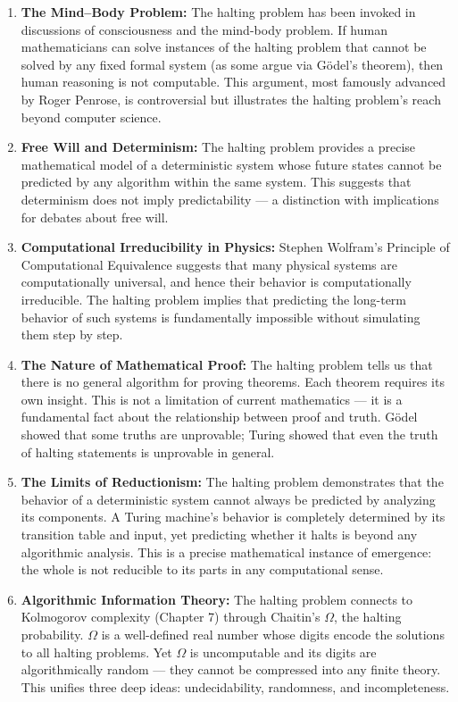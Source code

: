 \begin{enumerate}
\item \textbf{The Mind--Body Problem:} The halting problem has been invoked in discussions of consciousness and the mind-body problem. If human mathematicians can solve instances of the halting problem that cannot be solved by any fixed formal system (as some argue via G\"odel's theorem), then human reasoning is not computable. This argument, most famously advanced by Roger Penrose, is controversial but illustrates the halting problem's reach beyond computer science.

\item \textbf{Free Will and Determinism:} The halting problem provides a precise mathematical model of a deterministic system whose future states cannot be predicted by any algorithm within the same system. This suggests that determinism does not imply predictability — a distinction with implications for debates about free will.

\item \textbf{Computational Irreducibility in Physics:} Stephen Wolfram's Principle of Computational Equivalence suggests that many physical systems are computationally universal, and hence their behavior is computationally irreducible. The halting problem implies that predicting the long-term behavior of such systems is fundamentally impossible without simulating them step by step.

\item \textbf{The Nature of Mathematical Proof:} The halting problem tells us that there is no general algorithm for proving theorems. Each theorem requires its own insight. This is not a limitation of current mathematics — it is a fundamental fact about the relationship between proof and truth. G\"odel showed that some truths are unprovable; Turing showed that even the truth of halting statements is unprovable in general.

\item \textbf{The Limits of Reductionism:} The halting problem demonstrates that the behavior of a deterministic system cannot always be predicted by analyzing its components. A Turing machine's behavior is completely determined by its transition table and input, yet predicting whether it halts is beyond any algorithmic analysis. This is a precise mathematical instance of emergence: the whole is not reducible to its parts in any computational sense.

\item \textbf{Algorithmic Information Theory:} The halting problem connects to Kolmogorov complexity (Chapter 7) through Chaitin's $\Omega$, the halting probability. $\Omega$ is a well-defined real number whose digits encode the solutions to all halting problems. Yet $\Omega$ is uncomputable and its digits are algorithmically random — they cannot be compressed into any finite theory. This unifies three deep ideas: undecidability, randomness, and incompleteness.


\end{enumerate}
